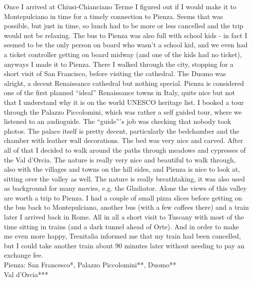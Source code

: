  Once I arrived at Chiusi-Chianciano Terme I figured out if I would make it to Montepulciano in time for a timely connection to Pienza. Seems that was possible, but just in time, so lunch had to be more or less cancelled and the trip would not be relaxing. The bus to Pienza was also full with school kids - in fact I seemed to be the only person on board who wasn't a school kid, and we even had a ticket controller getting on board midway (and one of the kids had no ticket), anyways I made it to Pienza. There I walked through the city, stopping for a short visit of San Francisco, before visiting the cathedral. The Duomo was alright, a decent Renaissance cathedral but nothing special. Pienza is considered one of the first planned ``ideal'' Renaissance towns in Italy, quite nice but not that I understand why it is on the world UNESCO heritage list. I booked a tour through the Palazzo Piccolomini, which was rather a self guided tour, where we listened to an audioguide. The ``guide'''s job was checking that nobody took photos. The palace itself is pretty decent, particularly the bedchamber and the chamber with leather wall decorations. The bed was very nice and carved. After all of that I decided to walk around the paths through meadows and cypresses of the Val d'Orcia. The nature is really very nice and beautiful to walk through, also with the villages and towns on the hill sides, and Pienza is nice to look at, sitting over the valley as well. The nature is really breathtaking, it was also used as background for many movies, e.g. the Gladiator. Alone the views of this valley are worth a trip to Pienza. I had a couple of small pizza slices before getting on the bus back to Montepulciano, another bus (with a few coffees there) and a train later I arrived back in Rome. All in all a short visit to Tuscany with most of the time sitting in trains (and a dark tunnel ahead of Orte). And in order to make me even more happy, Trenitalia informed me that my train had been cancelled, but I could take another train about 90 minutes later without needing to pay an exchange fee.\\

Pienza: San Francesco*, Palazzo Piccolomini**, Duomo**\\
Val d'Orcia***\\

